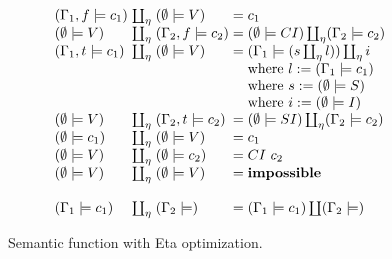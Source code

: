 \documentclass[conference]{IEEEtran}
\begin{document}
\begin{figure}
    \begin{equation*}
        \arraycolsep=1.4pt
        \begin{array}{l l l l l}
            (\Gamma_1,f \models c_1) & \coprod_\eta & (\emptyset \models V)    & = & c_1                                                        \\
            (\emptyset \models V)    & \coprod_\eta & (\Gamma_2,f \models c_2) & = & (\emptyset \models CI) \coprod_\eta (\Gamma_2 \models c_2) \\

            (\Gamma_1,t \models c_1) & \coprod_\eta & (\emptyset \models V)    & = & (\Gamma_1 \models (s \coprod_\eta l)) \coprod_\eta i       \\
                                     &              &                          &   & \text{where } l := (\Gamma_1 \models c_1 )                 \\
                                     &              &                          &   & \text{where } s := (\emptyset \models S )                  \\
                                     &              &                          &   & \text{where } i := (\emptyset \models I )                  \\
            (\emptyset \models V)    & \coprod_\eta & (\Gamma_2,t \models c_2) & = & (\emptyset \models SI) \coprod_\eta (\Gamma_2 \models c_2) \\
            (\emptyset \models c_1)  & \coprod_\eta & (\emptyset \models V)    & = & c_1                                                        \\
            (\emptyset \models V)    & \coprod_\eta & (\emptyset \models c_2)  & = & CI\ c_2                                                    \\
            (\emptyset \models V)    & \coprod_\eta & (\emptyset \models V)    & = & \mathbf{impossible}                                        \\
            \\

            (\Gamma_1 \models c_1)   & \coprod_\eta & (\Gamma_2 \models)       & = & (\Gamma_1 \models c_1) \coprod (\Gamma_2 \models)          \\
        \end{array}
    \end{equation*}
    \centering
    \caption{Semantic function with Eta optimization.}
    \label{fig:lazyeta-sem}
\end{figure}
\end{document}
